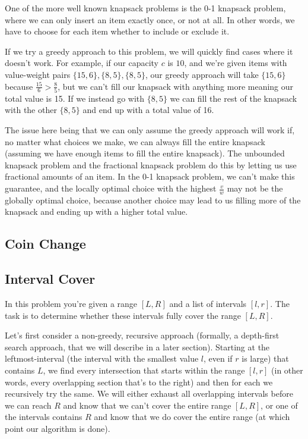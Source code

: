 \hrulefill

One of the more well known knapsack problems is the 0-1 knapsack problem, where we can only insert an item exactly once, or not at all. In other words, we have to choose for each item whether to include or exclude it.

If we try a greedy approach to this problem, we will quickly find cases where it doesn't work. For example, if our capacity $c$ is $10$, and we're given items with value-weight pairs $\{15,6\},\{8,5\},\{8,5\}$, our greedy approach will take $\{15,6\}$ because $\frac{15}{6} > \frac{8}{5}$, but we can't fill our knapsack with anything more meaning our total value is 15. If we instead go with $\{8,5\}$ we can fill the rest of the knapsack with the other $\{8,5\}$ and end up with a total value of 16.

The issue here being that we can only assume the greedy approach will work if, no matter what choices we make, we can always fill the entire knapsack (assuming we have enough items to fill the entire knapsack). The unbounded knapsack problem and the fractional knapsack problem do this by letting us use fractional amounts of an item. In the 0-1 knapsack problem, we can't make this guarantee, and the locally optimal choice with the highest $\frac{v}{w}$ may not be the globally optimal choice, because another choice may lead to us filling more of the knapsack and ending up with a higher total value.

\subsection{Coin Change}

\subsection{Interval Cover}

In this problem you're given a range $[L,R]$ and a list of intervals $[l,r]$. The task is to determine whether these intervals fully cover the range $[L,R]$.

Let's first consider a non-greedy, recursive approach (formally, a depth-first search approach, that we will describe in a later section). Starting at the leftmost-interval (the interval with the smallest value $l$, even if $r$ is large) that contains $L$, we find every intersection that starts within the range $[l,r]$ (in other words, every overlapping section that's to the right) and then for each we recursively try the same. We will either exhaust all overlapping intervals before we can reach $R$ and know that we can't cover the entire range $[L,R]$, or one of the intervals contains $R$ and know that we do cover the entire range (at which point our algorithm is done).

